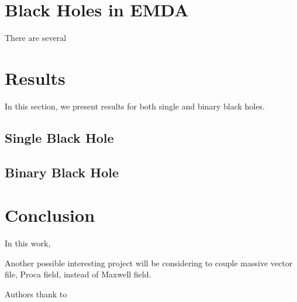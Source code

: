 \documentclass[%
 reprint,
 amsmath,amssymb,
 aps,
]{revtex4-1}
\begin{document}
\section{Black Holes in EMDA}
There are several 

\section{Results}
In this section, we present results for both single
and binary black holes.

\subsection{Single Black Hole}

\subsection{Binary Black Hole}



\section{Conclusion}
In this work, 

Another possible interesting project will be considering to couple massive vector file, Proca field, instead of Maxwell field.


\begin{acknowledgments}
Authors thank to
\end{acknowledgments}

\appendix
\end{document}
